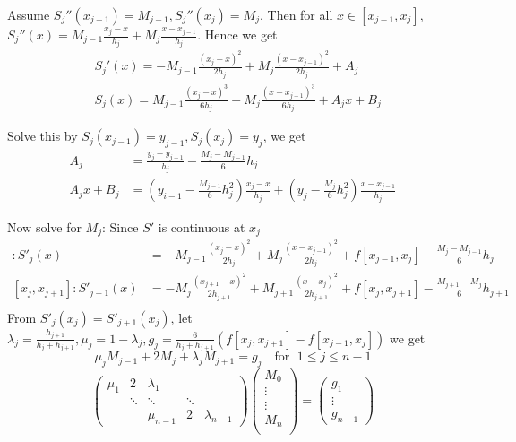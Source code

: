 \documentclass[11pt]{article}
\begin{document}
    Assume \(S_j''(x_{j-1})=M_{j-1},S_j''(x_j)=M_j\). Then for all
    \(x\in[x_{j-1},x_j]\),
    \(S_j''(x)=M_{j-1}\frac{x_j-x}{h_j}+M_j\frac{x-x_{j-1}}{h_j}\). Hence we get
    \begin{align*}
      &S_j'(x)=-M_{j-1}\frac{(x_j-x)^2}{2h_j}+M_j\frac{(x-x_{j-1})^2}{2h_j}+A_j\\
      &S_j(x)=M_{j-1}\frac{(x_j-x)^3}{6h_j}+M_j\frac{(x-x_{j-1})^3}{6h_j}+A_jx+B_j
    \end{align*}

    Solve this by \(S_j(x_{j-1})=y_{j-1},S_j(x_j)=y_j\), we get
    \begin{align*}
      A_j&=\frac{y_j-y_{j-1}}{h_j}-\frac{M_j-M_{j-1}}{6}h_j\\
      A_jx+B_j&=(y_{i-1}-\frac{M_{j-1}}{6}h_j^2)\frac{x_j-x}{h_j}+ 
                (y_j-\frac{M_j}{6}h_j^2)\frac{x-x_{j-1}}{h_j}
    \end{align*}

    Now solve for \(M_j\): Since \(S'\) is continuous at \(x_j\)
    \begin{align*}
      [x_{j-1},x_j]:S'_j(x)&=-M_{j-1}\frac{(x_j-x)^2}{2h_j}+M_j\frac{(x-x_{j-1})^2}{2h_j}
                             +f[x_{j-1},x_j]-\frac{M_j-M_{j-1}}{6}h_j\\
      [x_j,x_{j+1}]:S'_{j+1}(x)&=-M_j\frac{(x_{j+1}-x)^2}{2h_{j+1}}+M_{j+1}
                                 \frac{(x-x_j)^2}{2h_{j+1}}+f[x_j,x_{j+1}]-\frac{M_{j+1}-M_j}{6}h_{j+1}\\
    \end{align*}
    From \(S'_j(x_j)=S'_{j+1}(x_j)\), let \(\lambda_j=\frac{h_{j+1}}{h_j+h_{j+1}},
    \mu_j=1-\lambda_j,g_j=\frac{6}{h_j+h_{j+1}}(f[x_j,x_{j+1}]-f[x_{j-1},x_j])\)
    we get
    \begin{equation*}
      \mu_jM_{j-1}+2M_j+\lambda_jM_{j+1}=g_j\quad\text{for } \;1\le j\le n-1
    \end{equation*}
    \begin{equation*}
      \begin{pmatrix}
        \mu_1 & 2 & \lambda_1 &&\\
        & \ddots &\ddots &\ddots &\\
        &&\mu_{n-1}&2&\lambda_{n-1}
      \end{pmatrix}
      \begin{pmatrix}
        M_0\\
        \vdots\\
        \vdots\\
        M_n\\
      \end{pmatrix}=
      \begin{pmatrix}
        g_1\\
        \vdots\\
        g_{n-1}
      \end{pmatrix}
    \end{equation*}
\end{document}
